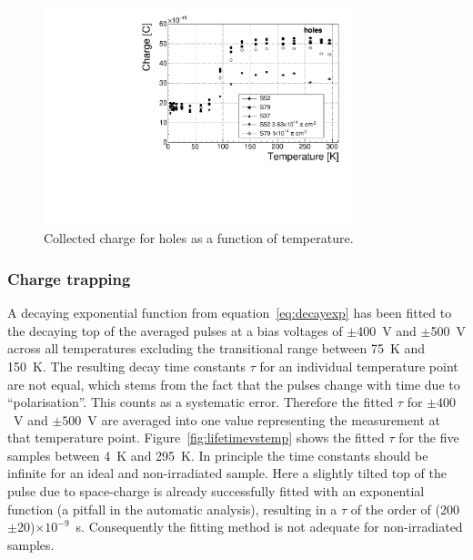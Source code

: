 \begin{figure}[!t]
\centering
\includegraphics[width=0.80\textwidth]{03_measurement_results/scripts/plots/charge-500V}
\caption{Collected charge for holes as a function of temperature.}
 \label{fig:chgtempholes}
\end{figure}

\subsubsection{Charge trapping}
A decaying exponential function from equation~\ref{eq:decayexp} has been fitted to the decaying top of the averaged pulses at a bias voltages of $\pm$400~V and $\pm$500~V across all temperatures excluding the transitional range between 75~K and 150~K. The resulting decay time constants $\tau$ for an individual temperature point are not equal, which stems from the fact that the pulses change with time due to ``polarisation''. This counts as a systematic error. Therefore the fitted $\tau$ for $\pm400$~V and $\pm500$~V are averaged into one value representing the measurement at that temperature point. Figure~\ref{fig:lifetimevstemp} shows the fitted $\tau$ for the five samples between 4~K and 295~K. In principle the time constants should be infinite for an ideal and non-irradiated sample. Here a slightly tilted top of the pulse due to space-charge is already successfully fitted with an exponential function (a pitfall in the automatic analysis), resulting in a $\tau$ of the order of (200$\pm$20)$\times10^{-9}$~s. Consequently the fitting method is not adequate for non-irradiated samples. 

